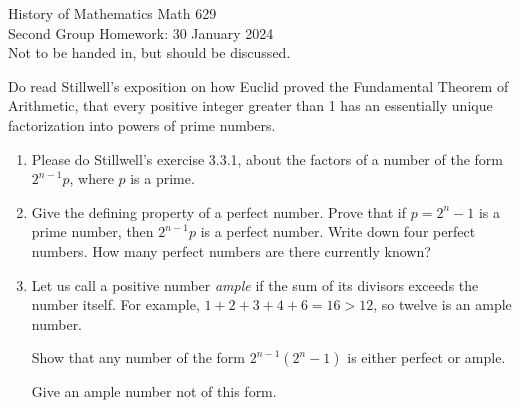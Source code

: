\documentclass[12pt]{article}
\begin{document}
\LARGE 
\noindent
{\color{Maroon}History of Mathematics \hfill Math 629}\vspace{2pt}\\
\large
Second Group Homework: \hfill 30 January 2024\\
Not to be handed in, but should be discussed.
\normalsize\vspace{10pt}




Do read Stillwell's exposition on how Euclid proved the Fundamental Theorem of Arithmetic, that every positive integer greater than 1 has an
essentially unique factorization into powers of prime numbers.



\begin{enumerate}

\item  Please do Stillwell's exercise 3.3.1, about the factors of a number of the form $2^{n-1}p$, where $p$ is a prime.

\item    Give the defining property of a perfect number. Prove that if $p=2^n-1$ is a prime number, then $2^{n-1}p$ is a perfect number.
  Write down four perfect numbers.
  How many perfect numbers are there currently known? 


\item Let us call a positive number {\color{blue}\it ample} if the sum of its divisors exceeds the number itself.
  For example, $1+2+3+4+6=16>12$, so twelve is an ample number.

  Show that any number of the form $2^{n-1}(2^n-1)$ is either perfect or ample.
  
  Give an ample number not of this form.


\end{enumerate}
\end{document}
